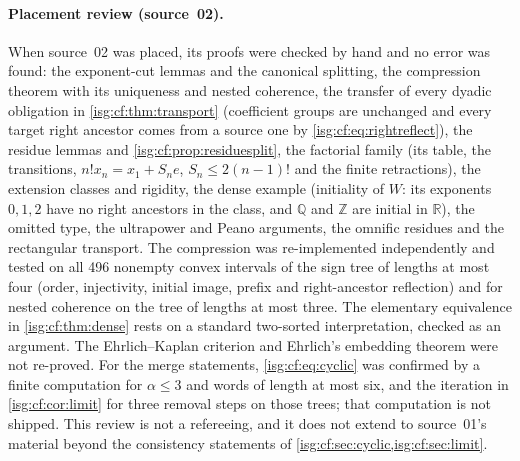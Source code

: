 \documentclass[11pt]{article}
\theoremstyle{definition}
\theoremstyle{remark}
\newcommand{\R}{\mathbb{R}}
\newcommand{\Z}{\mathbb{Z}}
\newcommand{\Q}{\mathbb{Q}}
\begin{document}
\paragraph{Placement review (source~02).} When source~02 was placed, its
proofs were checked by hand and no error was found: the exponent-cut
lemmas and the canonical splitting, the compression theorem with its
uniqueness and nested coherence, the transfer of every dyadic obligation
in \cref{isg:cf:thm:transport} (coefficient groups are unchanged and
every target right ancestor comes from a source one by
\eqref{isg:cf:eq:rightreflect}), the residue lemmas and
\cref{isg:cf:prop:residuesplit}, the factorial family (its table, the
transitions, $n!x_n=x_1+S_ne$, $S_n\le2(n-1)!$ and the finite
retractions), the extension classes and rigidity, the dense example
(initiality of $W$: its exponents $0,1,2$ have no right ancestors in the
class, and $\Q$ and $\Z$ are initial in $\R$), the omitted type, the
ultrapower and Peano arguments, the omnific residues and the rectangular
transport. The compression was re-implemented independently and tested
on all 496 nonempty convex intervals of the sign tree of lengths at most
four (order, injectivity, initial image, prefix and right-ancestor
reflection) and for nested coherence on the tree of lengths at most
three. The elementary equivalence in \cref{isg:cf:thm:dense} rests on a
standard two-sorted interpretation, checked as an argument. The
Ehrlich--Kaplan criterion and Ehrlich's embedding theorem were not
re-proved. For the merge statements, \eqref{isg:cf:eq:cyclic} was
confirmed by a finite computation for $\alpha\le3$ and words of length at
most six, and the iteration in \cref{isg:cf:cor:limit} for three removal
steps on those trees; that computation is not shipped. This review is not
a refereeing, and it does not extend to source~01's material beyond the
consistency statements of \cref{isg:cf:sec:cyclic,isg:cf:sec:limit}.
\end{document}
